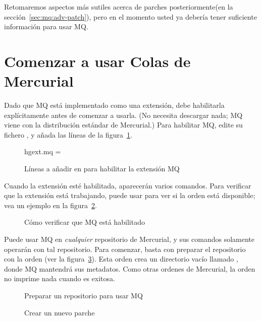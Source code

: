 Retomaremos aspectos más sutiles acerca de parches posteriormente(en
la sección~\ref{sec:mq:adv-patch}), pero en el momento usted ya
debería tener suficiente información para usar MQ.

\section{Comenzar a usar Colas de Mercurial}
\label{sec:mq:start}

Dado que MQ está implementado como una extensión, debe habilitarla
explícitamente antes de comenzar a usarla.  (No necesita descargar
nada; MQ viene con la distribución estándar de Mercurial.)  Para
habilitar MQ, edite su fichero , y añada las líneas
de la figura~\ref{ex:mq:config}.

\begin{figure}[ht]
  \begin{codesample4}
    [extensions]
    hgext.mq =
  \end{codesample4}
  \label{ex:mq:config}
  \caption{Líneas a añadir en  para habilitar la extensión MQ}
\end{figure}

Cuando la extensión esté habilitada, aparecerán varios comandos.  Para
verificar que la extensión está trabajando, puede usar 
para ver si la orden  está disponible; vea un
ejemplo en la figura~\ref{ex:mq:enabled}.

\begin{figure}[ht]
  \caption{Cómo verificar que MQ está habilitado}
  \label{ex:mq:enabled}
\end{figure}

Puede usar MQ en \emph{cualquier} repositorio de Mercurial, y sus
comandos solamente operarán con tal repositorio.  Para comenzar, basta
con preparar el repositorio con la orden (ver la
figura~\ref{ex:mq:qinit}).  Esta orden crea un directorio vacío
llamado , donde MQ mantendrá sus metadatos. Como
otras ordenes de Mercurial, la orden  no imprime
nada cuando es exitosa.

\begin{figure}[ht]
  \caption{Preparar un repositorio para usar MQ}
  \label{ex:mq:qinit}
\end{figure}

\begin{figure}[ht]
  \caption{Crear un nuevo parche}
  \label{ex:mq:qnew}
\end{figure}


